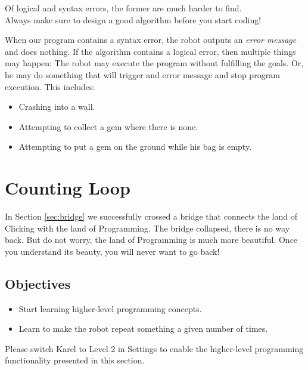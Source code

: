 \begin{gbox}
\begin{center}
Of logical and syntax errors, the former are much harder to find.\\
Always make sure to design a good algorithm before you start coding!
\end{center}
\end{gbox}
\vspace{4mm}

\noindent
When our program contains a syntax error,
the robot outputs an {\em error message} and does nothing.
If the algorithm contains a logical error, then multiple 
things may happen: The robot may execute the program 
without fulfilling the goals. Or, he may do something 
that will trigger and error message and stop program 
execution. This includes:

\begin{itemize}
\item Crashing into a wall.
\item Attempting to collect a gem where there is none.
\item Attempting to put a gem on the ground while his bag is empty.
\end{itemize}


\section{Counting Loop} \label{sec:repeat}

In Section \ref{sec:bridge} we successfully crossed a bridge that 
connects the land of Clicking with the land of Programming. The bridge 
collapsed, there is no way back. But do not worry, the land of Programming is much more beautiful.
Once you understand its beauty, you will never want to go back!

\subsection{Objectives} 

\begin{itemize}
\item Start learning higher-level programming concepts.
\item Learn to make the robot repeat something a given number of times.
\end{itemize}

\noindent
Please switch Karel to Level 2 in Settings to enable the higher-level 
programming functionality presented in this section.

